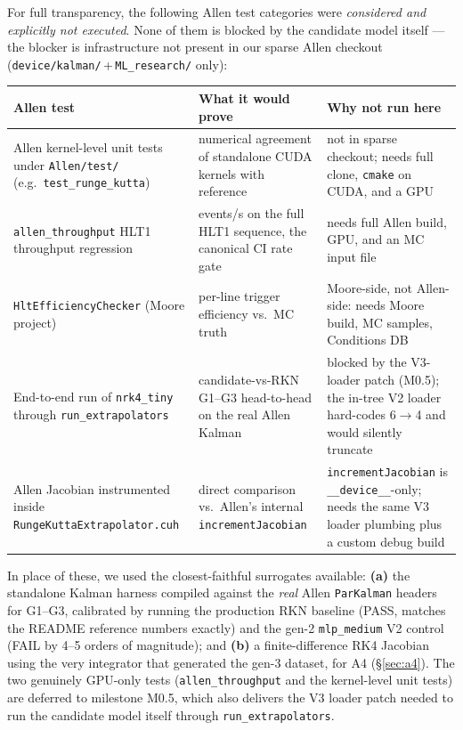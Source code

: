 \documentclass[11pt,a4paper]{article}
\begin{document}
For full transparency, the following Allen test categories were
\emph{considered and explicitly not executed}. None of them is blocked
by the candidate model itself --- the blocker is infrastructure not
present in our sparse Allen checkout
(\texttt{device/kalman/}\,+\,\texttt{ML\_research/} only):

\begin{center}\small
\begin{tabular}{p{} p{} p{}}
\toprule
Allen test & What it would prove & Why not run here \\
\midrule
Allen kernel-level unit tests under \texttt{Allen/test/}
  (e.g.\ \texttt{test\_runge\_kutta}) &
  numerical agreement of standalone CUDA kernels with reference &
  not in sparse checkout; needs full clone, \texttt{cmake} on
  CUDA, and a GPU \\[3pt]
\texttt{allen\_throughput} HLT1 throughput regression &
  events/s on the full HLT1 sequence, the canonical CI rate gate &
  needs full Allen build, GPU, and an MC input file \\[3pt]
\texttt{HltEfficiencyChecker} (Moore project) &
  per-line trigger efficiency vs.\ MC truth &
  Moore-side, not Allen-side: needs Moore build, MC samples,
  Conditions DB \\[3pt]
End-to-end run of \texttt{nrk4\_tiny} through
  \texttt{run\_extrapolators} &
  candidate-vs-RKN G1--G3 head-to-head on the real Allen Kalman &
  blocked by the V3-loader patch (M0.5); the in-tree V2 loader
  hard-codes 6$\to$4 and would silently truncate \\[3pt]
Allen Jacobian instrumented inside
  \texttt{RungeKuttaExtrapolator.cuh} &
  direct comparison vs.\ Allen's internal
  \texttt{incrementJacobian} &
  \texttt{incrementJacobian} is \texttt{\_\_device\_\_}-only;
  needs the same V3 loader plumbing plus a custom debug build \\
\bottomrule
\end{tabular}
\end{center}

In place of these, we used the closest-faithful surrogates available:
\textbf{(a)} the standalone Kalman harness compiled against the
\emph{real} Allen \texttt{ParKalman} headers for G1--G3, calibrated by
running the production RKN baseline (PASS, matches the README
reference numbers exactly) and the gen-2 \texttt{mlp\_medium} V2
control (FAIL by 4--5 orders of magnitude); and \textbf{(b)} a
finite-difference RK4 Jacobian using the very integrator that
generated the gen-3 dataset, for A4 (\S\ref{sec:a4}). The two
genuinely GPU-only tests (\texttt{allen\_throughput} and the
kernel-level unit tests) are deferred to milestone M0.5, which also
delivers the V3 loader patch needed to run the candidate model itself
through \texttt{run\_extrapolators}.
\end{document}

